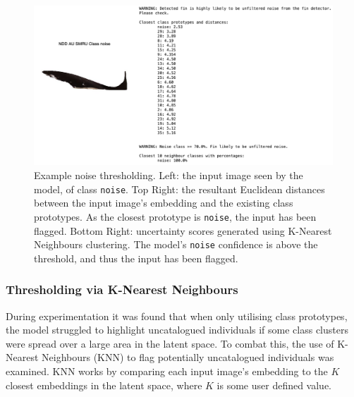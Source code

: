 \begin{figure}[t]
	\begin{center}
		\includegraphics[width=\linewidth]{Chapter6/figs/noise-example-ndd-au-smru-updated.png}
	\end{center}
	\caption[Example noise thresholding.]{Example noise thresholding. Left: the input image seen by the model, of class \texttt{noise}. Top Right: the resultant Euclidean distances between the input image's embedding and the existing class prototypes. As the closest prototype is \texttt{noise}, the input has been flagged. Bottom Right: uncertainty scores generated using K-Nearest Neighbours clustering. The model's \texttt{noise} confidence is above the threshold, and thus the input has been flagged.}
	\label{fig:noise-individual-example-ndd-au-smru}
\end{figure}

\subsubsection{Thresholding via K-Nearest Neighbours}\label{ch:ID,sec:ModelSelection,subsec:UncataloguedIndividualThresholding,subsub:KNN}

 During experimentation it was found that when only utilising class prototypes, the model struggled to highlight uncatalogued individuals if some class clusters were spread over a large area in the latent space. To combat this, the use of K-Nearest Neighbours (KNN) to flag potentially uncatalogued individuals was examined. KNN works by comparing each input image's embedding to the $K$ closest embeddings in the latent space, where $K$ is some user defined value. 
 
